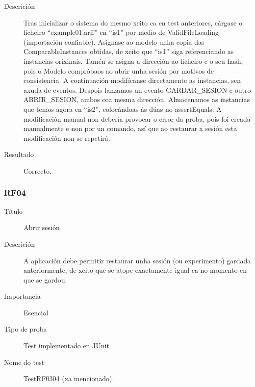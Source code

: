 \begin{description}
\item[Descrición]
Tras inicializar o sistema do mesmo xeito ca en test anteriores, cárgase o ficheiro ``example01.arff'' en ``is1'' por medio de ValidFileLoading (importación confiable). Asígnase ao modelo unha copia das ComparableInstances obtidas, de xeito que ``is1'' siga referenciando as instancias orixinais. Tamén se asigna a dirección ao ficheiro e o seu hash, pois o Modelo compróbaos ao abrir unha sesión por motivos de consistencia. A continuación modifícanse directamente as instancias, sen axuda de eventos. Despois lanzamos un evento GARDAR\_SESION e outro ABRIR\_SESION, ambos coa mesma dirección. Almacenamos as instancias que temos agora en ``is2'', colocándoas ás dúas no assertEquals. A modificación manual non debería provocar o error da proba, pois foi creada manualmente e non por un comando, así que ao restaurar a sesión esta modificación non se repetirá. 
\item[Resultado]
Correcto.
\end{description}

\subsubsection*{RF04}
\begin{description}
\item[Título] \hfill
Abrir sesión
\item[Descrición] \hfill
A aplicación debe permitir restaurar unha sesión (ou experimento) gardada anteriormente, de xeito que se atope exactamente igual ca no momento en que se gardou.
\item[Importancia] \hfill
Esencial
\item[Tipo de proba] \hfill
Test implementado en JUnit.
\item[Nome do test] \hfill
TestRF0304 (xa mencionado).
\end{description}

